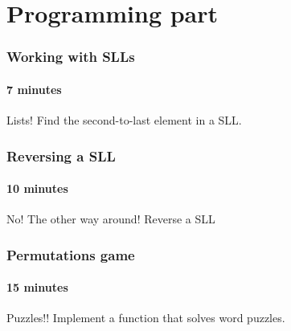 \section{Programming part}
\label{sec:programming_part}


\begin{frame}
	\frametitle{Working with SLLs}
	\framesubtitle{7 minutes}
	\begin{problemblock}{Lists!}
		Find the second-to-last element in a SLL.
	\end{problemblock}
\end{frame}

\begin{frame}
	\frametitle{Reversing a SLL}
	\framesubtitle{10 minutes}
	\begin{problemblock}{No! The other way around!}
		Reverse a SLL
	\end{problemblock}
\end{frame}

\begin{frame}
	\frametitle{Permutations game}
	\framesubtitle{15 minutes}

	\begin{problemblock}{Puzzles!!}
		Implement a function that solves word puzzles.
	\end{problemblock}
\end{frame}

